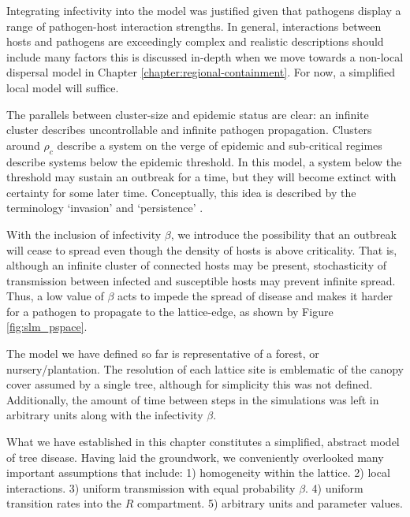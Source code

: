 Integrating infectivity into the model was justified given that pathogens display a range of %
pathogen-host interaction strengths. %
In general, interactions between hosts and pathogens are %
exceedingly complex %
and realistic descriptions should include many factors\textemdash %
this is discussed in-depth when we move towards a non-local dispersal model in Chapter \ref{chapter:regional-containment}. %
For now, a simplified local model will suffice. %


The parallels between cluster-size and epidemic status are clear: %
 an infinite cluster describes %
uncontrollable and infinite pathogen propagation. Clusters around $\rho_c$ describe a system %
on the verge of epidemic and sub-critical regimes describe systems below the epidemic threshold. %
In this model, a system below the threshold may sustain an outbreak for a time, but they will %
become extinct with certainty for some later time. %
Conceptually, this idea is described by the terminology `invasion' and `persistence' \cite{gilligan2008epidemiological}. %
 
With the inclusion of infectivity $\beta$, we introduce the possibility that an outbreak will %
cease to spread even though the density of hosts is above criticality. %
That is, although an infinite cluster of connected hosts may be present,  %
stochasticity of transmission between infected and susceptible hosts may prevent infinite spread. %
Thus, a low value of $\beta$ acts to impede the spread of disease and makes it harder for a pathogen %
to propagate to the lattice-edge, as shown by Figure \ref{fig:slm_pspace}. %

The model we have defined %
so far is representative of a forest, or nursery/plantation. %
The resolution of each lattice site is emblematic of the canopy cover assumed by a single tree, %
although for simplicity this was not defined. %
Additionally, the amount of time between steps in the simulations was left in arbitrary units %
along with the infectivity $\beta$. %

What we have established in this chapter constitutes a simplified, abstract model of tree %
disease. Having laid the groundwork, we conveniently overlooked many important assumptions %
that include: 1) homogeneity within the lattice. 2) local interactions. 3) uniform %
transmission with equal probability $\beta$. 4) uniform transition rates into the $R$ compartment. %
5) arbitrary units and parameter values.  %

